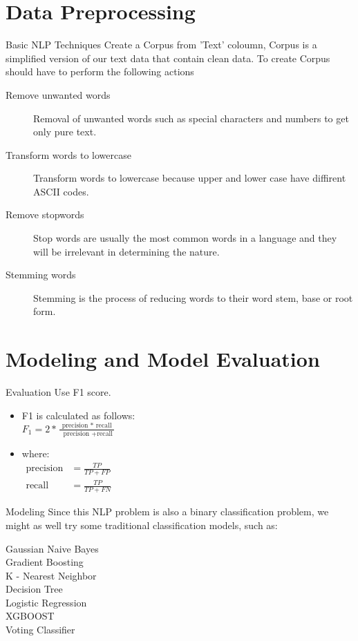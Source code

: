 \documentclass[
 size=12pt,
 paper=smartboard, %
 mode=present, %
 display=slides, %
 style=tuliplab,  %
 pauseslide,
 fleqn,leqno,clock]{powerdot}
\begin{document}
\section{Data Preprocessing}
\begin{slide}{Basic NLP Techniques}
	Create a Corpus from 'Text' coloumn, Corpus is a simplified version of our text data that contain clean data. To create Corpus should have to perform the following actions
	\begin{description}
	\item[Remove unwanted words] Removal of unwanted words such as special characters and numbers to get only pure text.
	\item[Transform words to lowercase] Transform words to lowercase because upper and lower case have diffirent ASCII codes.
	\item[Remove stopwords] Stop words are usually the most common words in a language and they will be irrelevant in determining the nature.
	\item[Stemming words] Stemming is the process of reducing words to their word stem, base or root form.
	\end{description}
\end{slide}

\section{Modeling and Model Evaluation}
\begin{slide}{Evaluation}
	Use F1 score.
  \begin{itemize}
    \item
          F1 is calculated as follows: \\[10 pt]
		$F _ { 1 } = 2 * \frac { \text { precision } * \text { recall } } { \text { precision } + \text {recall} }$
\\[10 pt]
    \item
		where: \\[10 pt]
		$\begin{aligned} \text {precision} & = \frac { T P } { T P + F P } \\ \text {recall} & = \frac { T P } { T P + F N } \end{aligned}$
  \end{itemize}
\end{slide}

\begin{slide}{Modeling}
	Since this NLP problem is also a binary classification problem, we might as well try some traditional classification models, such as:
		\begin{description}
	\item[Gaussian Naive Bayes]
	\item[Gradient Boosting]
	\item[K - Nearest Neighbor]
	\item[Decision Tree]
	\item[Logistic Regression]
	\item[XGBOOST]
	\item[Voting Classifier]
\end{description}
\end{slide}
\end{document}
